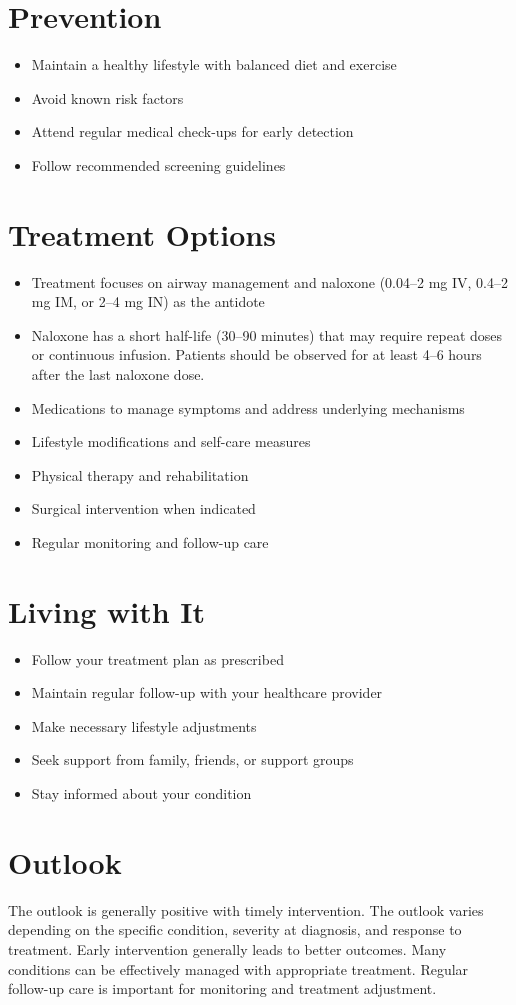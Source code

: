 \section{Prevention}
\begin{itemize}[noitemsep]
  \item Maintain a healthy lifestyle with balanced diet and exercise
  \item Avoid known risk factors
  \item Attend regular medical check-ups for early detection
  \item Follow recommended screening guidelines
\end{itemize}
\section{Treatment Options}
\begin{itemize}[noitemsep]
  \item Treatment focuses on airway management and naloxone (0.04--2 mg IV, 0.4--2 mg IM, or 2--4 mg IN) as the antidote
  \item Naloxone has a short half-life (30--90 minutes) that may require repeat doses or continuous infusion. Patients should be observed for at least 4--6 hours after the last naloxone dose.
  \item Medications to manage symptoms and address underlying mechanisms
  \item Lifestyle modifications and self-care measures
  \item Physical therapy and rehabilitation
  \item Surgical intervention when indicated
  \item Regular monitoring and follow-up care
\end{itemize}
\section{Living with It}
\begin{itemize}[noitemsep]
  \item Follow your treatment plan as prescribed
  \item Maintain regular follow-up with your healthcare provider
  \item Make necessary lifestyle adjustments
  \item Seek support from family, friends, or support groups
  \item Stay informed about your condition
\end{itemize}
\section{Outlook}
The outlook is generally positive with timely intervention. The outlook varies depending on the specific condition, severity at diagnosis, and response to treatment. Early intervention generally leads to better outcomes. Many conditions can be effectively managed with appropriate treatment. Regular follow-up care is important for monitoring and treatment adjustment.
